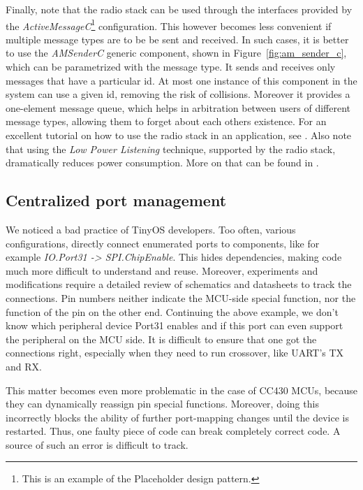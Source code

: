 Finally, note that the radio stack can be used through the interfaces provided by the \emph{ActiveMessageC}\footnote{This is an example of the Placeholder design pattern.} configuration. This however becomes less convenient if multiple message types are to be be sent and received. In such cases, it is better to use the \emph{AMSenderC} generic component, shown in Figure~\ref{fig:am_sender_c}, which can be parametrized with the message type. It sends and receives only messages that have a particular id. At most one instance of this component in the system can use a given id, removing the risk of collisions. Moreover it provides a one-element message queue, which helps in arbitration between users of different message types, allowing them to forget about each others existence. For an excellent tutorial on how to use the radio stack in an application, see \cite{MoteToMote}. Also note that using the \emph{Low Power Listening} technique, supported by the radio stack, dramatically reduces power consumption. More on that can be found in \cite{LowPowerApps}.


\subsection{Centralized port management}

We noticed a bad practice of TinyOS developers. Too often, various configurations, directly connect enumerated ports to components, like for example \emph{IO.Port31 -> SPI.ChipEnable}. This hides dependencies, making code much more difficult to understand and reuse. Moreover, experiments and modifications require a detailed review of schematics and datasheets to track the connections. Pin numbers neither indicate the MCU-side special function, nor the function of the pin on the other end. Continuing the above example, we don't know which peripheral device Port31 enables and if this port can even support the peripheral on the MCU side. It is difficult to ensure that one got the connections right, especially when they need to run crossover, like UART's TX and RX.

This matter becomes even more problematic in the case of CC430 MCUs, because they can dynamically reassign pin special functions. Moreover, doing this incorrectly blocks the ability of further port-mapping changes until the device is restarted. Thus, one faulty piece of code can break completely correct code. A source of such an error is difficult to track.

